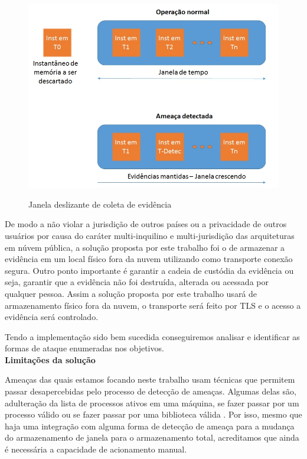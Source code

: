 \documentclass[
	12pt,				%
	openright,			%
	oneside,			%
	a4paper,			%
	english,			%
	french,				%
	spanish,			%
	brazil,				%
	]{abntex2}
\begin{document}
\begin{figure}[h!]
\caption{Janela deslizante de coleta de evidência}
\includegraphics[scale=0.5]{janela.jpg}
\centering
\label{fig:janela}
\end{figure}

De modo a não violar a jurisdição de outros países ou a privacidade de outros usuários por causa do caráter multi-inquilino e multi-jurisdição das arquiteturas em núvem pública,
a solução proposta por este trabalho foi o de armazenar a evidência em um local físico fora da nuvem utilizando como transporte conexão segura. Outro ponto importante é 
garantir a cadeia de custódia da evidência ou seja, garantir que a evidência não foi destruída, alterada ou acessada por qualquer pessoa. Assim a solução proposta por este 
trabalho usará de armazenamento físico fora da nuvem, o transporte será feito por TLS e o acesso a evidência será controlado.

Tendo a implementação sido bem sucedida conseguiremos analisar e identificar as formas de ataque enumeradas nos objetivos.\\

\textbf{Limitações da solução}

Ameaças das quais estamos focando neste trabalho usam técnicas que permitem passar desapercebidas pelo processo de detecção de ameaças. Algumas delas são, 
adulteração da lista de processos ativos em uma máquina, se fazer passar por um processo válido ou se fazer passar por uma biblioteca válida \cite{Case2014}. Por isso, 
mesmo que haja uma integração com alguma forma de detecção de ameaça para a mudança do armazenamento de janela para o armazenamento total, acreditamos que ainda é 
necessária a capacidade de acionamento manual.
\end{document}

